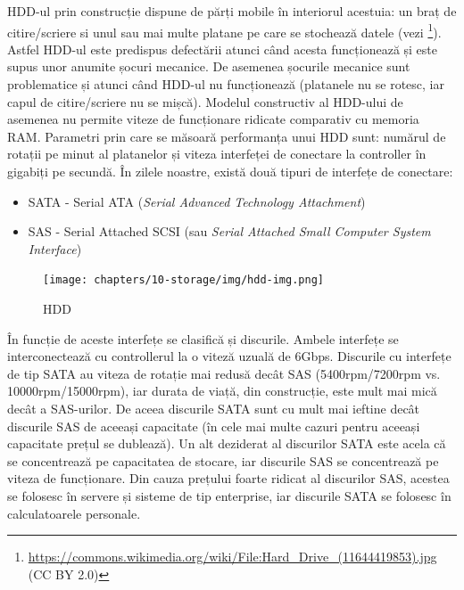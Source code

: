 HDD-ul prin construcție dispune de părți mobile în interiorul acestuia: un braț
de citire/scriere si unul sau mai multe platane pe care se stochează datele
(vezi \footnote{\url{https://commons.wikimedia.org/wiki/File:Hard\_Drive\_(11644419853).jpg} (CC BY 2.0)}). Astfel HDD-ul este predispus defectării atunci când acesta
funcționează și este supus unor anumite șocuri mecanice. De asemenea șocurile
mecanice sunt problematice și atunci când HDD-ul nu funcționează (platanele nu
se rotesc, iar capul de citire/scriere nu se mișcă). Modelul constructiv al
HDD-ului de asemenea nu permite viteze de funcționare ridicate comparativ cu
memoria RAM. Parametri prin care se măsoară performanța unui HDD sunt: numărul
de rotații pe minut al platanelor și viteza interfeței de conectare la
controller în gigabiți pe secundă. În zilele noastre, există două tipuri de
interfețe de conectare:

\begin{itemize}
  \item SATA - Serial ATA  (\textit{Serial Advanced Technology Attachment})
  \item SAS - Serial Attached SCSI  (sau
          \textit{Serial Attached Small Computer System Interface})
\end{itemize}

\begin{figure}[!htbp]
  \centering
  \texttt{[image: chapters/10-storage/img/hdd-img.png]}
  \caption{HDD}
  \label{fig:storage:hdd}
\end{figure}

În funcție de aceste interfețe se clasifică și discurile. Ambele interfețe se
interconectează cu controllerul la o viteză uzuală de 6Gbps. Discurile cu
interfețe de tip SATA au viteza de rotație mai redusă decât SAS (5400rpm/7200rpm
vs. 10000rpm/15000rpm), iar durata de viață, din construcție, este mult mai mică
decât a SAS-urilor. De aceea discurile SATA sunt cu mult mai ieftine decât
discurile SAS de aceeași capacitate (în cele mai multe cazuri pentru aceeași
capacitate prețul se dublează). Un alt deziderat al discurilor SATA este acela
că se concentrează pe capacitatea de stocare, iar discurile SAS se concentrează
pe viteza de funcționare. Din cauza prețului foarte ridicat al discurilor SAS,
acestea se folosesc în servere și sisteme de tip enterprise, iar discurile SATA
se folosesc în calculatoarele personale.

